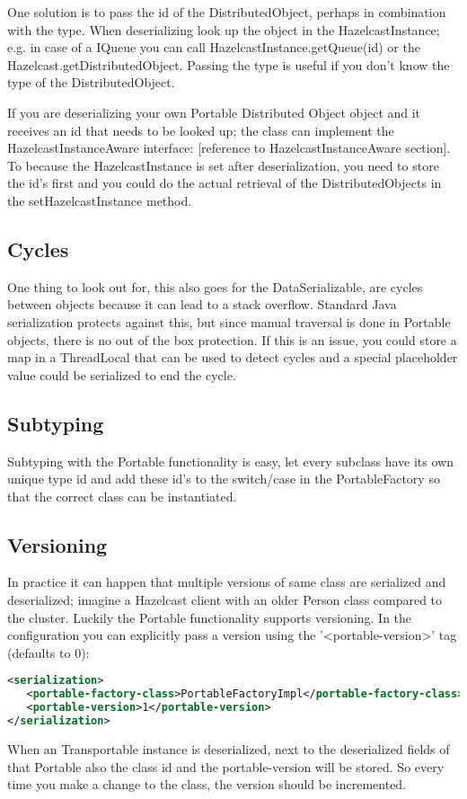 One solution is to pass the id of the DistributedObject, perhaps in combination with the type. When deserializing look up the object in the HazelcastInstance; e.g. in case of a IQueue you can call HazelcastInstance.getQueue(id) or the Hazelcast.getDistributedObject. Passing the type is useful if you don't know the type of the DistributedObject.

If you are deserializing your own Portable Distributed Object object and it receives an id that needs to be looked up; the class can implement the HazelcastInstanceAware interface: [reference to HazelcastInstanceAware section]. To because the HazelcastInstance is set after deserialization, you need to store the id's first and you could do the actual retrieval of the DistributedObjects in the setHazelcastInstance method.

\subsection*{Cycles}
One thing to look out for, this also goes for the DataSerializable, are cycles between objects because it can lead to a stack overflow. Standard Java serialization protects against this, but since manual traversal is done in Portable objects, there is no out of the box protection. If this is an issue, you could store a map in a ThreadLocal that can be used to detect cycles and a special placeholder value could be serialized to end the cycle.

\subsection*{Subtyping}
Subtyping with the Portable functionality is easy, let every subclass have its own unique type id and add these id's to the switch/case in the PortableFactory so that the correct class can be instantiated. 

\subsection*{Versioning}
In practice it can happen that multiple versions of same class are serialized and deserialized; imagine a Hazelcast client with an older Person class compared to the cluster. Luckily the Portable functionality supports versioning. In the configuration you can explicitly pass a version using the '<portable-version>' tag (defaults to 0):
\begin{lstlisting}[language=xml]
<serialization>
   <portable-factory-class>PortableFactoryImpl</portable-factory-class>
   <portable-version>1</portable-version>
</serialization>
\end{lstlisting}
When an Transportable instance is deserialized, next to the deserialized fields of that Portable also the class id and the portable-version will be stored. So every time you make a change to the class, the version should be incremented. 

